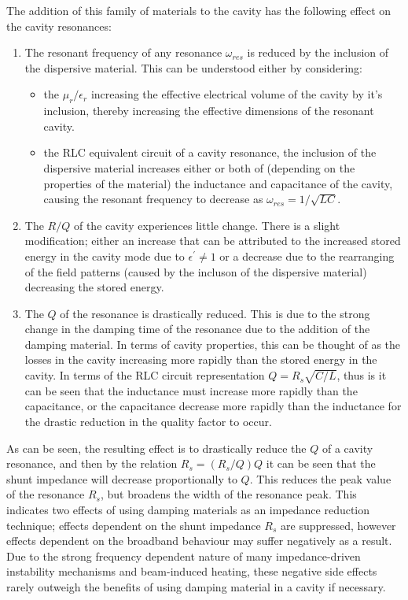 The addition of this family of materials to the cavity has the following effect on the cavity resonances:

\begin{enumerate}
\item{The resonant frequency of any resonance $\omega_{res}$ is reduced by the inclusion of the dispersive material. This can be understood either by considering:}
\begin{itemize}
\item{the $\mu_{r} / \epsilon_{r}$ increasing the effective electrical volume of the cavity by it's inclusion, thereby increasing the effective dimensions of the resonant cavity.}
\item{the RLC equivalent circuit of a cavity resonance, the inclusion of the dispersive material increases either or both of (depending on the properties of the material) the inductance and capacitance of the cavity, causing the resonant frequency to decrease as $\omega_{res} = 1/\sqrt{LC}$.}
\end{itemize}
\item{The $R/Q$ of the cavity experiences little change. There is a slight modification; either an increase that can be attributed to the increased stored energy in the cavity mode due to $\epsilon^{'} \neq 1$ or a decrease due to the rearranging of the field patterns (caused by the incluson of the dispersive material) decreasing the stored energy.}
\item{The $Q$ of the resonance is drastically reduced. This is due to the strong change in the damping time of the resonance due to the addition of the damping material. In terms of cavity properties, this can be thought of as the losses in the cavity increasing more rapidly than the stored energy in the cavity. In terms of the RLC circuit representation $Q = R_{s}\sqrt{C/L}$, thus is it can be seen that the inductance must increase more rapidly than the capacitance, or the capacitance decrease more rapidly than the inductance for the drastic reduction in the quality factor to occur.}
\end{enumerate} 

As can be seen, the resulting effect is to drastically reduce the $Q$ of a cavity resonance, and then by the relation $R_{s} = (R_{s}/Q) Q$ it can be seen that the shunt impedance will decrease proportionally to $Q$. This reduces the peak value of the resonance $R_{s}$, but broadens the width of the resonance peak. This indicates two effects of using damping materials as an impedance reduction technique; effects dependent on the shunt impedance $R_{s}$ are suppressed, however effects dependent on the broadband behaviour may suffer negatively as a result. Due to the strong frequency dependent nature of many impedance-driven instability mechanisms and beam-induced heating, these negative side effects rarely outweigh the benefits of using damping material in a cavity if necessary.

